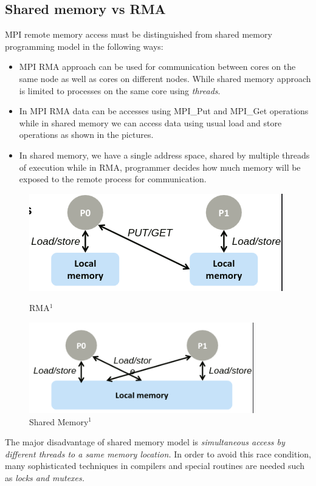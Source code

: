 \subsection{Shared memory vs RMA}
MPI remote memory access must be distinguished from shared memory programming model in the following ways:
\begin{itemize}
    \item MPI RMA approach can be used for communication between cores on the same node as well as cores on different
    nodes. While shared memory approach is limited to processes on the same core using \textit{threads}.
    \item In MPI RMA data can be accesses using {\ttfamily MPI\_Put} and {\ttfamily MPI\_Get} operations while in shared memory we can access data using usual load and store operations as shown in the pictures.
    \item In shared memory, we have a single address space, shared by multiple threads of execution while in RMA, programmer
    decides how much memory will be exposed to the remote process for communication. 
\end{itemize}
\begin{figure}
    \centering
    \begin{minipage}{.5\textwidth}
        \centering
        \includegraphics[width=0.78\linewidth]{attachments/rma.png}
        \caption{RMA$^1$}
    \end{minipage}%
    \begin{minipage}{.5\textwidth}
        \centering
        \includegraphics[width=0.78\linewidth]{attachments/shared_mem.png}
        \caption{Shared Memory$^1$}
    \end{minipage}
\end{figure}
The major disadvantage of shared memory model is \textit{simultaneous access by different threads to a same memory location.}
In order to avoid this race condition, many sophisticated techniques in compilers and special routines are needed such as 
\textit{locks and mutexes.}

